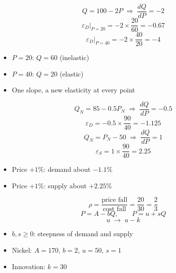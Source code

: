 \begin{frame}[plain,label=w2_15_elast_example]
  \Large
  \[
    \tag{44}\;Q = 100 - 2P \;\Rightarrow\; \frac{dQ}{dP} = -2
  \]
  \[
    \tag{45}\;\varepsilon_D\big|_{P = 20} = -2 \times \frac{20}{60} = -0.67
  \]
  \[
    \tag{46}\;\varepsilon_D\big|_{P = 40} = -2 \times \frac{40}{20} = -4
  \]

  \vspace{0.3em}
  \begin{itemize}\Large
    \item $P = 20$: $Q = 60$ (inelastic)
    \item $P = 40$: $Q = 20$ (elastic)
    \item One slope, a new elasticity at every point
  \end{itemize}
\end{frame}

\begin{frame}[plain,label=w2_16_we5]
  \Large
  \[
    \tag{47}\;Q_N = 85 - 0.5P_N \;\Rightarrow\; \frac{dQ}{dP} = -0.5
  \]
  \[
    \tag{48}\;\varepsilon_D = -0.5 \times \frac{90}{40} = -1.125
  \]
  \[
    \tag{49}\;Q_N = P_N - 50 \;\Rightarrow\; \frac{dQ}{dP} = 1
  \]
  \[
    \tag{50}\;\varepsilon_S = 1 \times \frac{90}{40} = 2.25
  \]

  \vspace{0.3em}
  \begin{itemize}\Large
    \item Price $+1\%$: demand about $-1.1\%$
    \item Price $+1\%$: supply about $+2.25\%$
  \end{itemize}
\end{frame}

\begin{frame}[plain,label=w2_17_we6a]
  \Large
  \[
    \tag{51}\;\rho = \frac{\text{price fall}}{\text{cost fall}} = \frac{20}{30} = \frac{2}{3}
  \]
  \[
    \tag{52}\;P = A - bQ, \qquad P = u + sQ
  \]
  \[
    \tag{53}\;u \;\longrightarrow\; u - k
  \]

  \vspace{0.3em}
  \begin{itemize}\Large
    \item $b, s \ge 0$: steepness of demand and supply
    \item Nickel: $A = 170$, $b = 2$, $u = 50$, $s = 1$
    \item Innovation: $k = 30$
  \end{itemize}
\end{frame}

